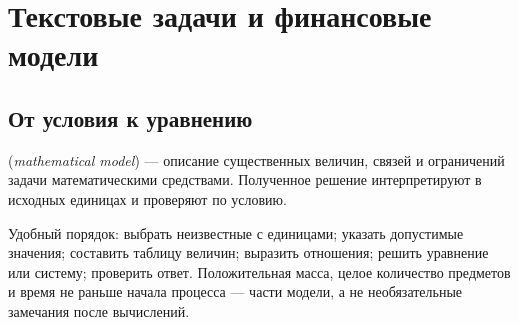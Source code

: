 \chapter{Текстовые задачи и финансовые модели}\label{chap:exam-models}
\section{От условия к уравнению}
\begin{definition} (\emph{mathematical model}) --- описание существенных величин, связей и ограничений задачи математическими средствами. Полученное решение интерпретируют в исходных единицах и проверяют по условию.\end{definition}
Удобный порядок: выбрать неизвестные с единицами; указать допустимые значения; составить таблицу величин; выразить отношения; решить уравнение или систему; проверить ответ. Положительная масса, целое количество предметов и время не раньше начала процесса --- части модели, а не необязательные замечания после вычислений.
